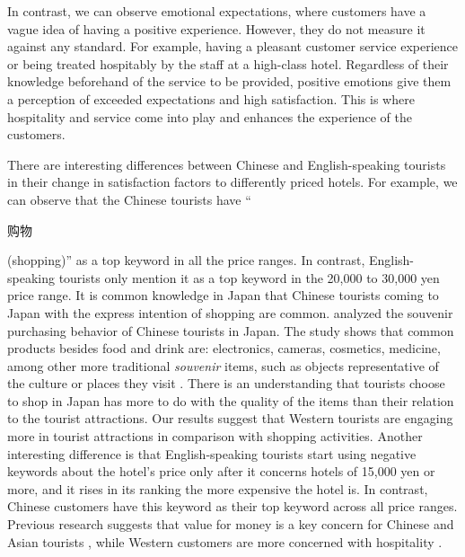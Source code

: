 \documentclass[smallextended,natbib]{svjour3}       %
\begin{document}
    In contrast, we can observe emotional expectations, where customers have a vague idea of having a positive experience. However, they do not measure it against any standard. For example, having a pleasant customer service experience or being treated hospitably by the staff at a high-class hotel. Regardless of their knowledge beforehand of the service to be provided, positive emotions give them a perception of exceeded expectations and high satisfaction. This is where hospitality and service come into play and enhances the experience of the customers. 

    There are interesting differences between Chinese and English-speaking tourists in their change in satisfaction factors to differently priced hotels. For example, we can observe that the Chinese tourists have ``\begin{CJK}{UTF8}{gbsn}购物\end{CJK} (shopping)'' as a top keyword in all the price ranges. In contrast, English-speaking tourists only mention it as a top keyword in the 20,000 to 30,000 yen price range. It is common knowledge in Japan that Chinese tourists coming to Japan with the express intention of shopping are common. \cite{tsujimoto2017purchasing} analyzed the souvenir purchasing behavior of Chinese tourists in Japan. The study shows that common products besides food and drink are: electronics, cameras, cosmetics, medicine, among other more traditional \textit{souvenir} items, such as objects representative of the culture or places they visit \cite{japan2014consumption}. There is an understanding that tourists choose to shop in Japan has more to do with the quality of the items than their relation to the tourist attractions. Our results suggest that Western tourists are engaging more in tourist attractions in comparison with shopping activities. Another interesting difference is that English-speaking tourists start using negative keywords about the hotel's price only after it concerns hotels of 15,000 yen or more, and it rises in its ranking the more expensive the hotel is. In contrast, Chinese customers have this keyword as their top keyword across all price ranges. Previous research suggests that value for money is a key concern for Chinese and Asian tourists \cite[][]{choi2000,choi2001,truong2009}, while Western customers are more concerned with hospitality \cite[][]{kozak2002}.  
\end{document}
